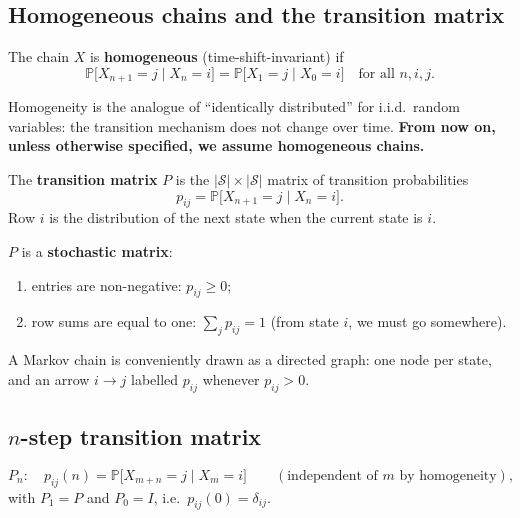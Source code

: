 \subsection{Homogeneous chains and the transition matrix}

\begin{definition}
The chain $X$ is \textbf{homogeneous} (time-shift-invariant) if
\[
\mathbb{P}\big[X_{n+1} = j \mid X_n = i\big] = \mathbb{P}\big[X_1 = j \mid X_0 = i\big] \quad \text{for all } n, i, j.
\]
\end{definition}

Homogeneity is the analogue of ``identically distributed'' for i.i.d.\ random variables: the transition mechanism does not change over time. \textbf{From now on, unless otherwise specified, we assume homogeneous chains.}

\begin{definition}
The \textbf{transition matrix} $P$ is the $|\mathcal{S}| \times |\mathcal{S}|$ matrix of transition probabilities
\[
p_{ij} = \mathbb{P}\big[X_{n+1} = j \mid X_n = i\big].
\]
Row $i$ is the distribution of the next state when the current state is $i$.
\end{definition}

$P$ is a \textbf{stochastic matrix}:
\begin{enumerate}
    \item[(a)] entries are non-negative: $p_{ij} \geq 0$;
    \item[(b)] row sums are equal to one: $\sum_j p_{ij} = 1$ (from state $i$, we must go somewhere).
\end{enumerate}
A Markov chain is conveniently drawn as a directed graph: one node per state, and an arrow $i \to j$ labelled $p_{ij}$ whenever $p_{ij} > 0$.

\subsection{$n$-step transition matrix}

\begin{definition}
\[
P_n : \quad p_{ij}(n) = \mathbb{P}\big[X_{m+n} = j \mid X_m = i\big] \qquad (\text{independent of } m \text{ by homogeneity}),
\]
with $P_1 = P$ and $P_0 = I$, i.e.\ $p_{ij}(0) = \delta_{ij}$.
\end{definition}

